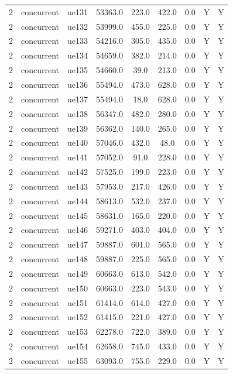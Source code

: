 \begin{table}[ht]
\begin{tabular}{|c|c|c|c|c|c|c|c|c|}
2 & concurrent & ue131 & 53363.0 & 223.0 & 422.0 & 0.0 & Y & Y \\
2 & concurrent & ue132 & 53999.0 & 455.0 & 225.0 & 0.0 & Y & Y \\
2 & concurrent & ue133 & 54216.0 & 305.0 & 435.0 & 0.0 & Y & Y \\
2 & concurrent & ue134 & 54659.0 & 382.0 & 214.0 & 0.0 & Y & Y \\
2 & concurrent & ue135 & 54660.0 & 39.0 & 213.0 & 0.0 & Y & Y \\
2 & concurrent & ue136 & 55494.0 & 473.0 & 628.0 & 0.0 & Y & Y \\
2 & concurrent & ue137 & 55494.0 & 18.0 & 628.0 & 0.0 & Y & Y \\
2 & concurrent & ue138 & 56347.0 & 482.0 & 280.0 & 0.0 & Y & Y \\
2 & concurrent & ue139 & 56362.0 & 140.0 & 265.0 & 0.0 & Y & Y \\
2 & concurrent & ue140 & 57046.0 & 432.0 & 48.0 & 0.0 & Y & Y \\
2 & concurrent & ue141 & 57052.0 & 91.0 & 228.0 & 0.0 & Y & Y \\
2 & concurrent & ue142 & 57525.0 & 199.0 & 223.0 & 0.0 & Y & Y \\
2 & concurrent & ue143 & 57953.0 & 217.0 & 426.0 & 0.0 & Y & Y \\
2 & concurrent & ue144 & 58613.0 & 532.0 & 237.0 & 0.0 & Y & Y \\
2 & concurrent & ue145 & 58631.0 & 165.0 & 220.0 & 0.0 & Y & Y \\
2 & concurrent & ue146 & 59271.0 & 403.0 & 404.0 & 0.0 & Y & Y \\
2 & concurrent & ue147 & 59887.0 & 601.0 & 565.0 & 0.0 & Y & Y \\
2 & concurrent & ue148 & 59887.0 & 225.0 & 565.0 & 0.0 & Y & Y \\
2 & concurrent & ue149 & 60663.0 & 613.0 & 542.0 & 0.0 & Y & Y \\
2 & concurrent & ue150 & 60663.0 & 223.0 & 543.0 & 0.0 & Y & Y \\
2 & concurrent & ue151 & 61414.0 & 614.0 & 427.0 & 0.0 & Y & Y \\
2 & concurrent & ue152 & 61415.0 & 221.0 & 427.0 & 0.0 & Y & Y \\
2 & concurrent & ue153 & 62278.0 & 722.0 & 389.0 & 0.0 & Y & Y \\
2 & concurrent & ue154 & 62658.0 & 745.0 & 433.0 & 0.0 & Y & Y \\
2 & concurrent & ue155 & 63093.0 & 755.0 & 229.0 & 0.0 & Y & Y \\

\end{tabular}
\end{table}
